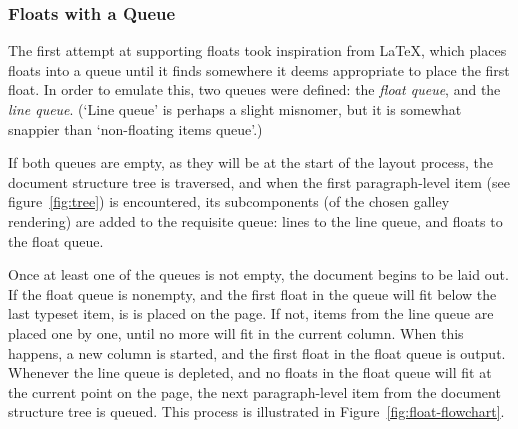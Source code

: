 \subsubsection{Floats with a Queue}
The first attempt at supporting floats took inspiration from \LaTeX, which places floats into a queue until it finds somewhere it deems appropriate to place the first float. In order to emulate this, two queues were defined: the \emph{float queue}, and the \emph{line queue}. (`Line queue' is perhaps a slight misnomer, but it is somewhat snappier than `non-floating items queue'.)


If both queues are empty, as they will be at the start of the layout process, the document structure tree is traversed, and when the first paragraph-level item (see figure~\ref{fig:tree}) is encountered, its subcomponents (of the chosen galley rendering) are added to the requisite queue: lines to the line queue, and floats to the float queue.

Once at least one of the queues is not empty, the document begins to be laid out. If the float queue is nonempty, and the first float in the queue will fit below the last typeset item, is is placed on the page. If not, items from the line queue are placed one by one, until no more will fit in the current column. When this happens, a new column is started, and the first float in the float queue is output. Whenever the line queue is depleted, and no floats in the float queue will fit at the current point on the page, the next paragraph-level item from the document structure tree is queued. This process is illustrated in Figure~\ref{fig:float-flowchart}.

